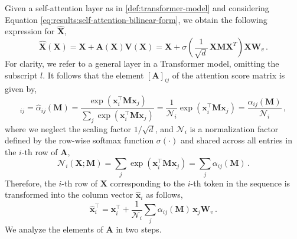%
Given a self-attention layer as in \cref{def:transformer-model} and considering Equation \cref{eq:results:self-attention-bilinear-form}, we obtain the following expression for $\hat{\bm{X}}$,
%
\begin{equation}
    \hat{\bm{X}}(\bm{X}) = \bm{X} + \bm{A}(\bm{X})\bm{V}(\bm{X}) = \bm{X} + \sigma\left(\frac{1}{\sqrt{d}}\,\bm{X} \bm{M}\bm{X}^T\right)\bm{X}\bm{W}_v \,.
\end{equation}
%
For clarity, we refer to a general layer in a Transformer model, omitting the subscript $l$.
%
It follows that the element $[\bm{A}]_{ij}$ of the attention score matrix is given by, 
%
\begin{equation}
    [\bm{A}]_{ij} =  \hat{\alpha}_{ij}(\bm{M}) = \frac{\exp{(\bm{x}_i^\top \bm{M} \bm{x}_j)}}{\sum_j \exp{(\bm{x}_i^\top \bm{M} \bm{x}_j)}} = \frac{1}{\mathcal{N}_i}\exp{(\bm{x}_i^\top \bm{M} \bm{x}_j)} = \frac{\alpha_{ij}(\bm{M})}{\mathcal{N}_i} \,,
\end{equation}
%
where we neglect the scaling factor $1 / \sqrt{d}$, and $\mathcal{N}_i$ is a normalization factor defined by the row-wise softmax function $\sigma(\cdot)$ and shared across all entries in the $i$-th row of $\bm{A}$,
%
\begin{equation}
    \mathcal{N}_i(\bm{X}; \bm{M}) = \sum_j \exp{(\bm{x}_i^\top \bm{M} \bm{x}_j)} = \sum_j \alpha_{ij}(\bm{M}) \,.
\end{equation}
%
Therefore, the $i$-th row of $\bm{X}$ corresponding to the $i$-th token in the sequence is transformed into the column vector $\hat{\bm{x}}_i$ as follows,
%
\begin{equation}
\hat{\bm{x}}^\top_i = \bm{x}^\top_i + \frac{1}{\mathcal{N}_i}\sum_j\alpha_{ij}(\bm{M})\,\bm{x}_j\bm{W}_v\,.
\end{equation}
%
We analyze the elements of $\bm{A}$ in two steps.


